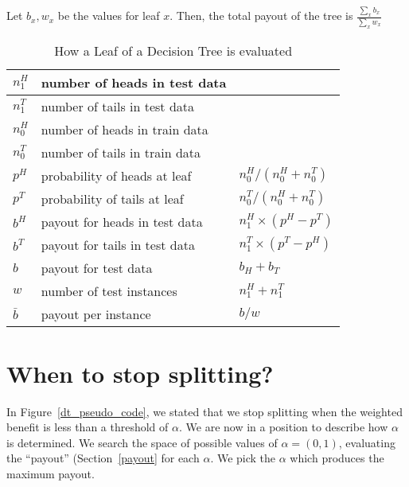 Let \(b_x, w_x\) be the values for leaf \(x\). Then, the total payout of the tree is \(\frac{\sum_x b_x}{\sum_x w_x}\)

\begin{table}[hbtp]
\centering
\begin{tabular}{|l|l|l|} \hline \hline
\(n^H_1\) & number of heads in test data & \\ \hline
\(n^T_1\) & number of tails in test data & \\ \hline
\(n^H_0\) & number of heads in train data&  \\ \hline
\(n^T_0\) & number of tails in train data&  \\ \hline
\(p^H\) & probability of heads at leaf & \(n^H_0 / (n^H_0 + n^T_0)\) \\ \hline
\(p^T\) & probability of tails at leaf & \(n^T_0 / (n^H_0 + n^T_0)\) \\ \hline
\(b^H\) & payout for heads in test data & \(n^H_1 \times ( p^H - p^T )\)  \\ \hline
\(b^T\) & payout for tails in test data & \(n^T_1 \times ( p^T - p^H )\)  \\ \hline
\(b\) & payout for test data & \(b_H + b_T\) \\ \hline

\(w\) & number of test instances & \(n^H_1 + n^T_1\) \\ \hline
\(\bar{b}\) & payout per instance & \(b/w\) \\ \hline
\hline
\end{tabular}
\label{dt_eval_code}
\caption{How a Leaf of a Decision Tree is evaluated}
\end{table}

\section{When to stop splitting?}

In Figure~\ref{dt_pseudo_code}, we stated that we stop splitting when the weighted benefit
is less than a threshold of \(\alpha\). We are now in a position to describe how
\(\alpha\) is determined. We search the space of possible values of \(\alpha =
(0, 1)\), evaluating the ``payout'' (Section~\ref{payout} for each \(\alpha\). 
We pick the \(\alpha\) which produces the maximum payout. 



